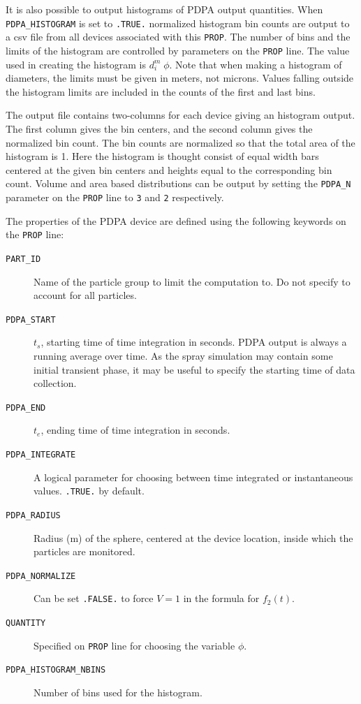 \documentclass[11pt]{book}
\newcommand{\ct}{\tt\small}
\begin{document}
It is also possible to output histograms of PDPA output quantities. When {\ct PDPA\_HISTOGRAM} is set to {\ct .TRUE.} normalized histogram bin counts  are output to  a csv file from all devices associated with this {\ct PROP}. The number of bins and the limits of the histogram are controlled by parameters on the {\ct PROP} line. The value used in creating the histogram is $d_i^m \; \phi$. Note that when making a histogram of diameters, the limits must be given in meters, not microns. Values falling outside the histogram limits are included in the counts of the first and last bins.

The output file contains two-columns for each device giving an histogram output. The first column gives the bin centers, and the second column gives the normalized bin count. The bin counts are normalized so that the total area of the histogram is 1. Here the histogram is thought consist of equal width bars centered at the given bin centers and heights equal to the corresponding bin count. Volume and area based distributions can be output by setting the {\ct PDPA\_N} parameter on the {\ct PROP} line  to {\ct 3} and {\ct 2} respectively.

The properties of the PDPA device are defined using the following keywords on the {\ct PROP} line:
\begin{description}
\item[{\ct PART\_ID}] Name of the particle group to limit the computation to. Do not specify to account for all particles.
\item[{\ct PDPA\_START}] $t_s$, starting time of time integration in seconds. PDPA output is always a running average over time.
As the spray simulation may contain some initial transient phase, it may be useful to specify the starting time of data collection.
\item[{\ct PDPA\_END}] $t_e$, ending time of time integration in seconds.
\item[{\ct PDPA\_INTEGRATE}] A logical parameter for choosing between time integrated or instantaneous values. {\ct .TRUE.} by default.
\item[{\ct PDPA\_RADIUS}] Radius (m) of the sphere, centered at the device location, inside which the particles are monitored.
\item[{\ct PDPA\_NORMALIZE}] Can be set {\ct .FALSE.} to force $V = 1$ in the formula for $f_2(t)$.
\item[{\ct QUANTITY}] Specified on {\ct PROP} line for choosing the variable $\phi$.
\item[{\ct PDPA\_HISTOGRAM\_NBINS}] Number of bins used for the histogram.
\end{description}
\end{document}
